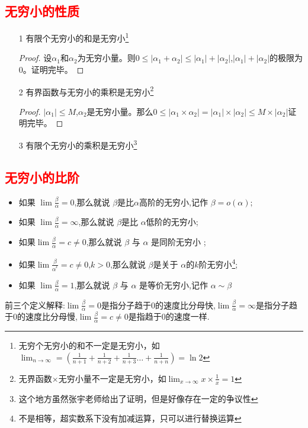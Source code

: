 \documentclass[12pt, a4paper, oneside, UTF8]{ctexbook}  %
\begin{document}
\begin{sloppypar}
    \subsection{\textcolor{red}{无穷小的性质}}
    \begin{itemize}
        \item[1] 有限个无穷小的和是无穷小\footnote{无穷个无穷小的和不一定是无穷小，如$\lim_{n \to \infty}=(\frac{1}{n+1}+\frac{1}{n+2}+\frac{1}{n+3}\dots +\frac{1}{n+n})=\ln 2$}
            \begin{proof}
                设$\alpha_1$和$\alpha_2$为无穷小量。则$0 \leqslant |\alpha_1+\alpha_2|\leqslant |\alpha_1|+|\alpha_2|$,$|\alpha_1|+|\alpha_2|$的极限为0。证明完毕。
            \end{proof}
        \item[2] 有界函数与无穷小的乘积是无穷小\footnote{无界函数$\times$无穷小量不一定是无穷小，如$\lim_{x \to \infty}x \times \frac{1}{x}=1$}
            \begin{proof}
                $|\alpha _1|\leqslant M$,$\alpha_2$是无穷小量。那么$0\leqslant|\alpha_1 \times \alpha_2|=|\alpha_1|\times |\alpha_2|\leqslant M \times |\alpha_2|$证明完毕。
            \end{proof}
        \item[3] 有限个无穷小的乘积是无穷小\footnote{这个地方虽然张宇老师给出了证明，但是好像存在一定的争议性}
    \end{itemize}
    \subsection{\textcolor{red}{无穷小的比阶}}
    \begin{defn}{}{}
        \begin{itemize}
            \item 如果 $\lim \frac{\beta}{\alpha} =0$,那么就说 $\beta$是比$\alpha$高阶的无穷小,记作 $\beta=o(\alpha);$
            \item  如果 $\lim \frac\beta\alpha  =\infty$,那么就说 $\beta$是比 $\alpha$低阶的无穷小;
            \item 如果$\lim\frac{\beta}{\alpha} =c\neq 0$,那么就说 $\beta$ 与 $\alpha$ 是同阶无穷小 ;
            \item 如果$\lim\frac{\beta}{\alpha^{^k}} =c \neq 0$,$k > 0$,那么就说 $\beta$是关于 $\alpha$的$k$阶无穷小\footnote{不是相等，超实数系下没有加减运算，只可以进行替换运算};
            \item 如果 $\lim \frac\beta\alpha = 1$,那么就说 $\beta$ 与 $\alpha$ 是等价无穷小,记作 $\alpha\sim\beta$
        \end{itemize}
    \end{defn}
    前三个定义解释:$\lim \frac{\beta}{\alpha} =0$是指分子趋于$0$的速度比分母快,$\lim \frac\beta\alpha  =\infty$是指分子趋于$0$的速度比分母慢,$\lim\frac{\beta}{\alpha} =c\neq 0$是指趋于$0$的速度一样.


\end{sloppypar}
\end{document}
